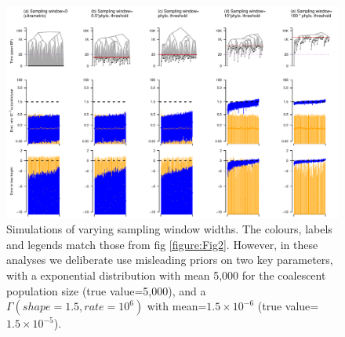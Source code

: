 \documentclass[11pt]{article}
\begin{document}
\begin{landscape}
	\begin{figure}[H]
		\begin{center}
			\includegraphics[scale=0.7, angle=0]{summary_all_estimates_misleading_prior.pdf}
			\caption{Simulations of varying sampling window widths. The colours, labels and legends match those from fig \ref{figure:Fig2}. However, in these analyses we deliberate use misleading priors on two key parameters, with a exponential distribution with mean 5,000 for the coalescent population size (true value=5,000), and a $\Gamma(shape=1.5, rate=10^{6})$ with mean=$1.5\times10^{-6}$ (true value=$1.5\times10^{-5}$).}
			\label{figure:Fig3}
		\end{center}
	\end{figure}
\end{landscape}
\end{document}
